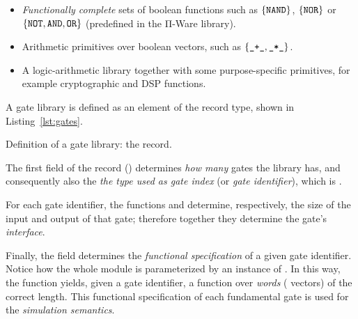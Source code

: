             \begin{itemize}
                \item \emph{Functionally complete} sets of boolean functions such as
                    $\{ \text{\texttt{NAND}} \}$, $\{ \text{\texttt{NOR}} \}$ or
                    $\{ \text{\texttt{NOT}}, \text{\texttt{AND}}, \text{\texttt{OR}} \}$
                    (predefined in the Π-Ware library).
                \item Arithmetic primitives over boolean vectors, such as $\{ \text{\texttt{\_+\_}}, \text{\texttt{\_*\_}} \}$.
                \item A logic-arithmetic library together with some purpose-specific primitives,
                    for example cryptographic and \ac{DSP} functions.
            \end{itemize}

            A gate library is defined as an element of the  record type, shown in Listing~\ref{lst:gates}.

            \begin{listing}[h]
                \newline
                \caption{Definition of a gate library: the  record.\label{lst:gates}}
            \end{listing}

            The first field of the  record () determines \emph{how many}
            gates the library has, and consequently also the \emph{the type used as gate index}
            (or \emph{gate identifier}), which is  \AY{=}  .

            For each gate identifier, the functions  and  determine, respectively,
            the size of the input and output of that gate; therefore together they determine the gate's \emph{interface}.

            Finally, the  field determines the \emph{functional specification} of a given gate identifier.
            Notice how the whole  module is parameterized by an instance of .
            In this way, the  function yields, given a gate identifier, a function over \emph{words}
            ( vectors) of the correct length.
            This functional specification of each fundamental gate is used for the \emph{simulation semantics}.

